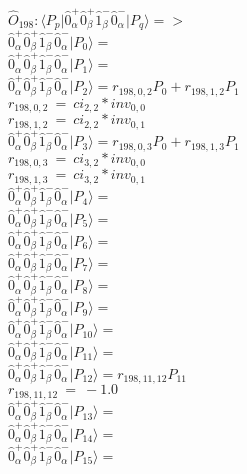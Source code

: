 \documentclass[14pt]{article}
\begin{document}
    $\hat{O}_{198}:  \langle{P_p}\vert \hat{0}_{\alpha}^{+}\hat{0}_{\beta}^{+}\hat{1}_{\beta}^{-}\hat{0}_{\alpha}^{-} \vert{P_q}\rangle => $ \\ 
    $ \hat{0}_{\alpha}^{+}\hat{0}_{\beta}^{+}\hat{1}_{\beta}^{-}\hat{0}_{\alpha}^{-} \vert{P_{0}}\rangle =  $ \\ 
    $ \hat{0}_{\alpha}^{+}\hat{0}_{\beta}^{+}\hat{1}_{\beta}^{-}\hat{0}_{\alpha}^{-} \vert{P_{1}}\rangle =  $ \\ 
    $ \hat{0}_{\alpha}^{+}\hat{0}_{\beta}^{+}\hat{1}_{\beta}^{-}\hat{0}_{\alpha}^{-} \vert{P_{2}}\rangle = {r}_{198,0,2}P_{0}+{r}_{198,1,2}P_{1} $ \\ 
    ${r}_{198,0,2}\ =\ {ci}_{2,2}*{inv}_{0,0} $ \\ 
    ${r}_{198,1,2}\ =\ {ci}_{2,2}*{inv}_{0,1} $ \\ 
    $ \hat{0}_{\alpha}^{+}\hat{0}_{\beta}^{+}\hat{1}_{\beta}^{-}\hat{0}_{\alpha}^{-} \vert{P_{3}}\rangle = {r}_{198,0,3}P_{0}+{r}_{198,1,3}P_{1} $ \\ 
    ${r}_{198,0,3}\ =\ {ci}_{3,2}*{inv}_{0,0} $ \\ 
    ${r}_{198,1,3}\ =\ {ci}_{3,2}*{inv}_{0,1} $ \\ 
    $ \hat{0}_{\alpha}^{+}\hat{0}_{\beta}^{+}\hat{1}_{\beta}^{-}\hat{0}_{\alpha}^{-} \vert{P_{4}}\rangle =  $ \\ 
    $ \hat{0}_{\alpha}^{+}\hat{0}_{\beta}^{+}\hat{1}_{\beta}^{-}\hat{0}_{\alpha}^{-} \vert{P_{5}}\rangle =  $ \\ 
    $ \hat{0}_{\alpha}^{+}\hat{0}_{\beta}^{+}\hat{1}_{\beta}^{-}\hat{0}_{\alpha}^{-} \vert{P_{6}}\rangle =  $ \\ 
    $ \hat{0}_{\alpha}^{+}\hat{0}_{\beta}^{+}\hat{1}_{\beta}^{-}\hat{0}_{\alpha}^{-} \vert{P_{7}}\rangle =  $ \\ 
    $ \hat{0}_{\alpha}^{+}\hat{0}_{\beta}^{+}\hat{1}_{\beta}^{-}\hat{0}_{\alpha}^{-} \vert{P_{8}}\rangle =  $ \\ 
    $ \hat{0}_{\alpha}^{+}\hat{0}_{\beta}^{+}\hat{1}_{\beta}^{-}\hat{0}_{\alpha}^{-} \vert{P_{9}}\rangle =  $ \\ 
    $ \hat{0}_{\alpha}^{+}\hat{0}_{\beta}^{+}\hat{1}_{\beta}^{-}\hat{0}_{\alpha}^{-} \vert{P_{10}}\rangle =  $ \\ 
    $ \hat{0}_{\alpha}^{+}\hat{0}_{\beta}^{+}\hat{1}_{\beta}^{-}\hat{0}_{\alpha}^{-} \vert{P_{11}}\rangle =  $ \\ 
    $ \hat{0}_{\alpha}^{+}\hat{0}_{\beta}^{+}\hat{1}_{\beta}^{-}\hat{0}_{\alpha}^{-} \vert{P_{12}}\rangle = {r}_{198,11,12}P_{11} $ \\ 
    ${r}_{198,11,12}\ =\ -1.0 $ \\ 
    $ \hat{0}_{\alpha}^{+}\hat{0}_{\beta}^{+}\hat{1}_{\beta}^{-}\hat{0}_{\alpha}^{-} \vert{P_{13}}\rangle =  $ \\ 
    $ \hat{0}_{\alpha}^{+}\hat{0}_{\beta}^{+}\hat{1}_{\beta}^{-}\hat{0}_{\alpha}^{-} \vert{P_{14}}\rangle =  $ \\ 
    $ \hat{0}_{\alpha}^{+}\hat{0}_{\beta}^{+}\hat{1}_{\beta}^{-}\hat{0}_{\alpha}^{-} \vert{P_{15}}\rangle =  $ \\ 
    
\end{document}
